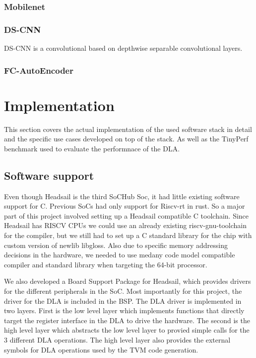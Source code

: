 \documentclass[12pt,a4paper,english
]{tunithesis}
\begin{document}
\subsection{Mobilenet}
\subsection{DS-CNN}
DS-CNN is a convolutional based on depthwise separable convolutional layers.~\
\subsection{FC-AutoEncoder}

\chapter{Implementation}
\label{ch:implementation}
This section covers the actual implementation of the used software stack in detail and the specific use cases developed on top of the stack. As well as the TinyPerf benchmark used to evaluate the performnace of the DLA.

\section{Software support}
\label{sec:software_support}
Even though Headsail is the third SoCHub Soc, it had little existing software support for C. Previous SoCs had only support for Riscv-rt in rust. So a major part of this project involved setting up a Headsail compatible C toolchain. Since Headsail has RISCV CPUs we could use an already existing riscv-gnu-toolchain for the compiler, but we still had to set up a C standard library for the chip with custom version of newlib libgloss. Also due to specific memory addressing decisions in the hardware, we needed to use medany code model compatible compiler and standard library when targeting the 64-bit processor.

We also developed a Board Support Package for Headsail, which provides drivers for the different peripherals in the SoC. Most importantly for this project, the driver for the DLA is included in the BSP.
The DLA driver is implemented in two layers. First is the low level layer which implements functions that directly target the register interface in the DLA to drive the hardware. The second is the high level layer which abstracts the low level layer to provied simple calls for the 3 different DLA operations. The high level layer also provides the external symbols for DLA operations used by the TVM code generation.
\end{document}
